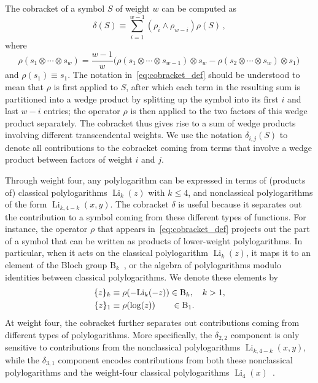 \documentclass[11pt]{article}
\DeclareMathOperator{\Li}{Li}
\begin{document}
The cobracket of a symbol $S$ of weight $w$ can be computed as
\begin{equation} \label{eq:cobracket_def}
\delta(S) \equiv \sum_{i=1}^{w-1} (\rho_i \wedge \rho_{w-i})\rho(S) \, ,
\end{equation}
where
\begin{equation}
\rho(s_1 \otimes \cdots \otimes s_w ) = \frac{w-1}{w} \Big(\rho(s_1 \otimes \cdots \otimes s_{w-1}) \otimes s_w - \rho(s_2 \otimes \cdots \otimes s_{w}) \otimes s_1 \Big) \, 
\end{equation}
and $\rho(s_1) \equiv s_1$. The notation in~\eqref{eq:cobracket_def} should be understood to mean that $\rho$ is first applied to $S$, after which each term in the resulting sum is partitioned into a wedge product by splitting up the symbol into its first $i$ and last $w{-}i$ entries; the operator $\rho$ is then applied to the two factors of this wedge product separately. The cobracket thus gives rise to a sum of wedge products involving different transcendental weights. We use the notation $\delta_{i,j}(S)$ to denote all contributions to the cobracket coming from terms that involve a wedge product between factors of weight $i$ and $j$. 

Through weight four, any polylogarithm can be expressed in terms of (products of) classical polylogarithms $\Li_k(z)$ with $k \leq 4$, and nonclassical polylogarithms of the form $\Li_{k,4-k}(x,y)$. The cobracket $\delta$ is useful because it separates out the contribution to a symbol coming from these different types of functions. For instance, the operator $\rho$ that appears in~\eqref{eq:cobracket_def} projects out the part of a symbol that can be written as products of lower-weight polylogarithms. In particular, when it acts on the classical polylogarithm $\Li_k(z)$, it maps it to an element of the Bloch group $\text{B}_k$~\cite{Bloch:2000, Suslin:1990}, or the algebra of polylogarithms modulo identities between classical polylogarithms. We denote these elements by
\begin{align}
 \{ z \}_k  &\equiv \rho(-\text{Li}_k(-z)) \in \text{B}_k, \quad k>1, \\
 \{ z \}_1  &\equiv \rho(\log(z)) \hspace{.675cm} \in \text{B}_1.
\end{align}
At weight four, the cobracket further separates out contributions coming from different types of polylogarithms. More specifically, the $\delta_{2,2}$ component is only sensitive to contributions from the nonclassical polylogarithms $\Li_{k,4-k}(x,y)$, while the $\delta_{3,1}$ component encodes contributions from both these nonclassical polylogarithms and the weight-four classical polylogarithms $\Li_4(x)$~\cite{G91a,2008arXiv0809.3984D,GanglPolylogIdentities,2018arXiv180107816G,2018arXiv180308585G}. 
\end{document}
